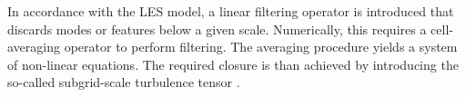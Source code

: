 
In accordance with the \ac{LES} model, a linear filtering operator 
is introduced that discards modes or features below a given scale. 
Numerically, this requires a cell-averaging operator to perform filtering.
%
%
%
%
%
The averaging procedure 
yields a 
system of non-linear equations. 
%
%
%
The required closure is than achieved by introducing the 
so-called subgrid-scale turbulence tensor \citep{Radice:2017zta}. 

